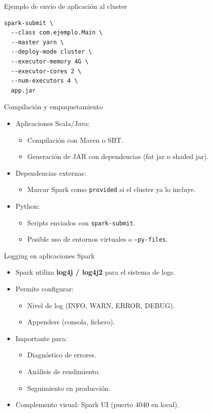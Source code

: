 \documentclass{beamer}
\begin{document}
\begin{frame}[fragile]{Ejemplo de envío de aplicación al cluster}
\begin{verbatim}
spark-submit \
  --class com.ejemplo.Main \
  --master yarn \
  --deploy-mode cluster \
  --executor-memory 4G \
  --executor-cores 2 \
  --num-executors 4 \
  app.jar
\end{verbatim}
\end{frame}

\begin{frame}{Compilación y empaquetamiento}
\begin{itemize}
  \item Aplicaciones Scala/Java:
  \begin{itemize}
    \item Compilación con Maven o SBT.
    \item Generación de JAR con dependencias (fat jar o shaded jar).
  \end{itemize}
  \item Dependencias externas:
  \begin{itemize}
    \item Marcar Spark como \texttt{provided} si el cluster ya lo incluye.
  \end{itemize}
  \item Python:
  \begin{itemize}
    \item Scripts enviados con \texttt{spark-submit}.
    \item Posible uso de entornos virtuales o \texttt{--py-files}.
  \end{itemize}
\end{itemize}
\end{frame}

\begin{frame}{Logging en aplicaciones Spark}
\begin{itemize}
  \item Spark utiliza \textbf{log4j / log4j2} para el sistema de logs.
  \item Permite configurar:
  \begin{itemize}
    \item Nivel de log (INFO, WARN, ERROR, DEBUG).
    \item Appenders (consola, fichero).
  \end{itemize}
  \item Importante para:
  \begin{itemize}
    \item Diagnóstico de errores.
    \item Análisis de rendimiento.
    \item Seguimiento en producción.
  \end{itemize}
  \item Complemento visual: Spark UI (puerto 4040 en local).
\end{itemize}
\end{frame}
\end{document}
